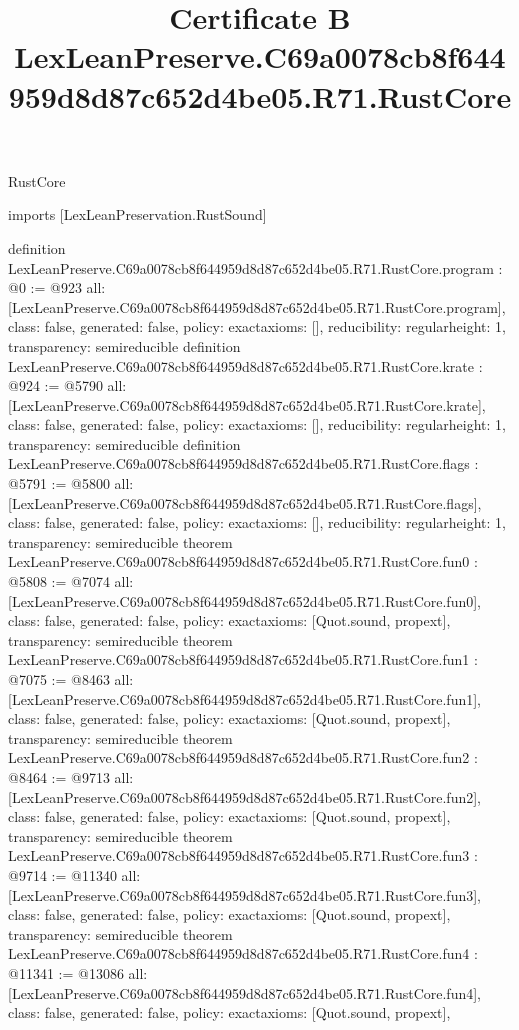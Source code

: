 \begin{lexlean}{RustCore}
\title{Certificate B LexLeanPreserve.C69a0078cb8f644959d8d87c652d4be05.R71.RustCore}
\begin{coremodule}
imports [LexLeanPreservation.RustSound]

definition LexLeanPreserve.C69a0078cb8f644959d8d87c652d4be05.R71.RustCore.program : @0 := @923 {
  all: [LexLeanPreserve.C69a0078cb8f644959d8d87c652d4be05.R71.RustCore.program],
  class: false,
  generated: false,
  policy: exact{axioms: []},
  reducibility: regular{height: 1},
  transparency: semireducible
}
definition LexLeanPreserve.C69a0078cb8f644959d8d87c652d4be05.R71.RustCore.krate : @924 := @5790 {
  all: [LexLeanPreserve.C69a0078cb8f644959d8d87c652d4be05.R71.RustCore.krate],
  class: false,
  generated: false,
  policy: exact{axioms: []},
  reducibility: regular{height: 1},
  transparency: semireducible
}
definition LexLeanPreserve.C69a0078cb8f644959d8d87c652d4be05.R71.RustCore.flags : @5791 := @5800 {
  all: [LexLeanPreserve.C69a0078cb8f644959d8d87c652d4be05.R71.RustCore.flags],
  class: false,
  generated: false,
  policy: exact{axioms: []},
  reducibility: regular{height: 1},
  transparency: semireducible
}
theorem LexLeanPreserve.C69a0078cb8f644959d8d87c652d4be05.R71.RustCore.fun0 : @5808 := @7074 {
  all: [LexLeanPreserve.C69a0078cb8f644959d8d87c652d4be05.R71.RustCore.fun0],
  class: false,
  generated: false,
  policy: exact{axioms: [Quot.sound, propext]},
  transparency: semireducible
}
theorem LexLeanPreserve.C69a0078cb8f644959d8d87c652d4be05.R71.RustCore.fun1 : @7075 := @8463 {
  all: [LexLeanPreserve.C69a0078cb8f644959d8d87c652d4be05.R71.RustCore.fun1],
  class: false,
  generated: false,
  policy: exact{axioms: [Quot.sound, propext]},
  transparency: semireducible
}
theorem LexLeanPreserve.C69a0078cb8f644959d8d87c652d4be05.R71.RustCore.fun2 : @8464 := @9713 {
  all: [LexLeanPreserve.C69a0078cb8f644959d8d87c652d4be05.R71.RustCore.fun2],
  class: false,
  generated: false,
  policy: exact{axioms: [Quot.sound, propext]},
  transparency: semireducible
}
theorem LexLeanPreserve.C69a0078cb8f644959d8d87c652d4be05.R71.RustCore.fun3 : @9714 := @11340 {
  all: [LexLeanPreserve.C69a0078cb8f644959d8d87c652d4be05.R71.RustCore.fun3],
  class: false,
  generated: false,
  policy: exact{axioms: [Quot.sound, propext]},
  transparency: semireducible
}
theorem LexLeanPreserve.C69a0078cb8f644959d8d87c652d4be05.R71.RustCore.fun4 : @11341 := @13086 {
  all: [LexLeanPreserve.C69a0078cb8f644959d8d87c652d4be05.R71.RustCore.fun4],
  class: false,
  generated: false,
  policy: exact{axioms: [Quot.sound, propext]},
}
\end{coremodule}
\end{lexlean}
